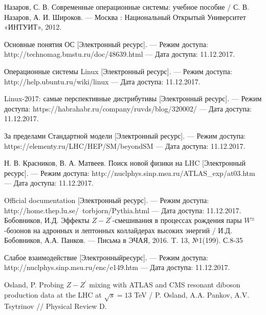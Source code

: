 

	Назаров, С. В. 
	Современные операционные системы: учебное пособие 
	/ С. В. Назаров, А. И. Широков. 
	— Москва : Национальный Открытый Университет «ИНТУИТ», 2012.

	Основные понятия ОС 
	[Электронный ресурс].
	 — Режим досту­па: http://technomag.bmstu.ru/doc/48639.html
	 — Дата доступа: 11.12.2017.

	Операционные системы Linux 
	[Электронный ресурс].
	 — Ре­жим доступа: http://help.ubuntu.ru/wiki/linux
	 — Дата доступа: 11.12.2017.
	 
	 Linux-2017: самые перспективные дистрибутивы  
	 [Электронный ресурс].
	 — Ре­жим доступа: https://habrahabr.ru/company/ruvds/blog/320002/
	 — Дата доступа: 11.12.2017.

	За пределами Стандартной модели
	[Электронный ресурс].
	 — Режим доступа: https://elementy.ru/LHC/HEP/SM/beyondSM 
	 — Да­та доступа: 11.12.2017.


	Н. В. Красников, В. А. 
	Матвеев. Поиск новой физики на LHC
	[Электронный ресурс].
	 — Режим доступа: http://nuclphys.sinp.msu.ru/ATLAS\_exp/at03.htm 
	 — Дата доступа: 11.12.2017.
	 
	 Official documentation
	 [Электронный ресурс].
	 — Режим доступа: http://home.thep.lu.se/~torbjorn/Pythia.html 
	 — Дата доступа: 11.12.2017.
	Бобовников, И.Д. Эффекты $Z-Z^\prime$-смешивания в процессах рождения пары $W^±$-бозонов на адронных и лептонных коллайдерах высоких энергий
	/ И.Д. Бобовников, А.А. Панков.
	— Письма в ЭЧАЯ, 2016. T. 13, №1(199). С.8-35
	
	Слабое взаимодействие 
	[Электронныйресурс].
	— Режим доступа: http://nuclphys.sinp.msu.ru/enc/e149.htm
	— Дата доступа: 11.12.2017.

	 
	Osland, P. Probing $Z-Z^\prime$ mixing with ATLAS and CMS resonant diboson production data at the LHC at $\sqrt{s}=13$ TeV
	/ P. Osland, A.A. Pankov, A.V. Tsytrinov 
	// Physical Review D.




